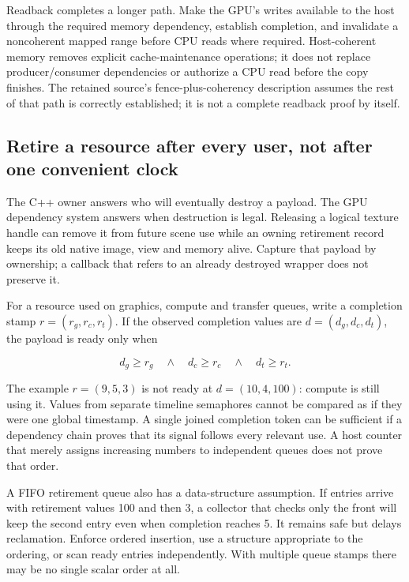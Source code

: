 Readback completes a longer path. Make the GPU's writes available to the host through the required memory dependency, establish completion, and invalidate a noncoherent mapped range before CPU reads where required. Host-coherent memory removes explicit cache-maintenance operations; it does not replace producer/consumer dependencies or authorize a CPU read before the copy finishes. The retained source's fence-plus-coherency description assumes the rest of that path is correctly established; it is not a complete readback proof by itself.

\subsection{Retire a resource after every user, not after one convenient clock}\label{01-foundations-i-ch011-retire-a-resource-after-every-user-not-after-one-convenient-clock}

\hypertarget{01-foundations-i-ch011-retire-a-resource-after-every-user-not-after-one-convenient-clock}{}

The C++ owner answers who will eventually destroy a payload. The GPU dependency system answers when destruction is legal. Releasing a logical texture handle can remove it from future scene use while an owning retirement record keeps its old native image, view and memory alive. Capture that payload by ownership; a callback that refers to an already destroyed wrapper does not preserve it.

For a resource used on graphics, compute and transfer queues, write a completion stamp \(r=(r_g,r_c,r_t)\). If the observed completion values are \(d=(d_g,d_c,d_t)\), the payload is ready only when

\[
d_g\ge r_g\quad\land\quad d_c\ge r_c\quad\land\quad d_t\ge r_t.
\]

The example \(r=(9,5,3)\) is not ready at \(d=(10,4,100)\): compute is still using it. Values from separate timeline semaphores cannot be compared as if they were one global timestamp. A single joined completion token can be sufficient if a dependency chain proves that its signal follows every relevant use. A host counter that merely assigns increasing numbers to independent queues does not prove that order.

A FIFO retirement queue also has a data-structure assumption. If entries arrive with retirement values 100 and then 3, a collector that checks only the front will keep the second entry even when completion reaches 5. It remains safe but delays reclamation. Enforce ordered insertion, use a structure appropriate to the ordering, or scan ready entries independently. With multiple queue stamps there may be no single scalar order at all.

